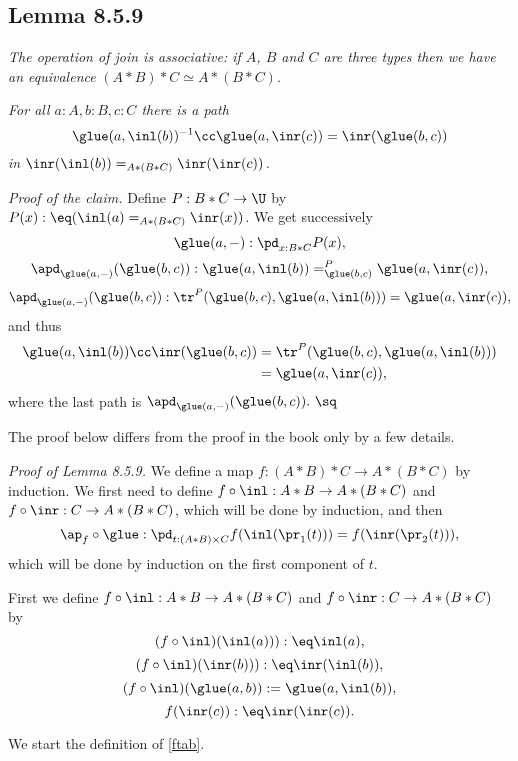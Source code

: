\documentclass[12pt]{article}
\begin{document}
\subsection{Lemma 8.5.9}%

\nn{} \emph{The operation of join is associative: if $A$, $B$ and $C$ are three types then we have an equivalence} $(A*B)*C\simeq A*(B*C)$.

\nn{} \emph{For all $a:A,b:B,c:C$ there is a path 
$$
\glue(a,\inl(b))^{-1}\cc\glue(a,\inr(c))=\inr(\glue(b,c))
$$ 
in $\inr(\inl(b))=_{A*(B*C)}\inr(\inr(c))$.}

\nn\emph{Proof of the claim.} Define $P:B*C\to\U$ by $P(x):\eq(\inl(a)=_{A*(B*C)}\inr(x))$. We get successively 
$$
\glue(a,-):\pd_{x:B*C}P(x),
$$ 
$$
\apd_{\glue(a,-)}(\glue(b,c)):\glue(a,\inl(b))=^P_{\glue(b,c)}\glue(a,\inr(c)),
$$ 
$$
\apd_{\glue(a,-)}(\glue(b,c)):\tr^P(\glue(b,c),\glue(a,\inl(b)))=\glue(a,\inr(c)),
$$ 
and thus 
\begin{align*}
\glue(a,\inl(b))\cc\inr(\glue(b,c))&=\tr^P(\glue(b,c),\glue(a,\inl(b)))\\
&=\glue(a,\inr(c)),
\end{align*} 
where the last path is $\apd_{\glue(a,-)}(\glue(b,c)).\ \sq$

The proof below differs from the proof in the book only by a few details.

\nn\emph{Proof of Lemma 8.5.9.} We define a map $f:(A*B)*C\to A*(B*C)$ by induction. We first need to define $f\circ\inl:A*B\to A*(B*C)$ and $f\circ\inr:C\to A*(B*C)$, which will be done by induction, and then 
\begin{equation}\label{ftab}
\ap_f\circ\glue:\pd_{t:(A*B)\times C}f(\inl(\pr_1(t)))=f(\inr(\pr_2(t))),
\end{equation}  
which will be done by induction on the first component of $t$. 

First we define $f\circ\inl:A*B\to A*(B*C)$ and $f\circ\inr:C\to A*(B*C)$ by 
$$
(f\circ\inl)(\inl(a))):\eq\inl(a),
$$ 
$$
(f\circ\inl)(\inr(b))):\eq\inr(\inl(b)),
$$ 
\begin{equation}\label{fabbb}
(f\circ\inl)(\glue(a,b)):=\glue(a,\inl(b)),
\end{equation}
$$
f(\inr(c)):\eq\inr(\inr(c)).
$$

We start the definition of \eqref{ftab}. 
\end{document}
